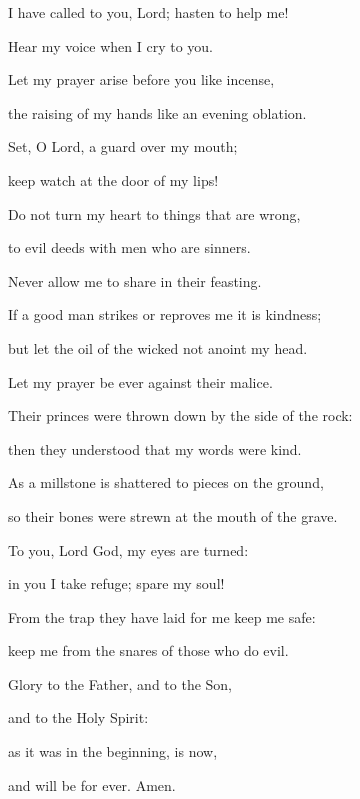 \noindent I have called to you, Lord; hasten to help me!~\GreStar{}~\nopagebreak

Hear my voice when I cry to you.

\noindent Let my prayer arise before you like incense,~\GreStar{}~\nopagebreak

the raising of my hands like an evening oblation.

\noindent Set, O Lord, a guard over my mouth;~\GreStar{}~\nopagebreak

keep watch at the door of my lips!

\noindent Do not turn my heart to things that are wrong,~\GreStar{}~\nopagebreak

to evil deeds with men who are sinners.

\noindent Never allow me to share in their feasting.~\GreStar{}~\nopagebreak

If a good man strikes or reproves me it is kindness;

\noindent but let the oil of the wicked not anoint my head.~\GreStar{}~\nopagebreak

Let my prayer be ever against their malice.

\noindent Their princes were thrown down by the side of the rock:~\GreStar{}~\nopagebreak

then they understood that my words were kind.

\noindent As a millstone is shattered to pieces on the ground,~\GreStar{}~\nopagebreak

so their bones were strewn at the mouth of the grave.

\noindent To you, Lord God, my eyes are turned:~\GreStar{}~\nopagebreak

in you I take refuge; spare my soul!

\noindent From the trap they have laid for me keep me safe:~\GreStar{}~\nopagebreak

keep me from the snares of those who do evil.

\noindent Glory to the Father, and to the Son,~\GreStar{}~\nopagebreak

and to the Holy Spirit:

\noindent as it was in the beginning, is now,~\GreStar{}~\nopagebreak

and will be for ever. Amen.
